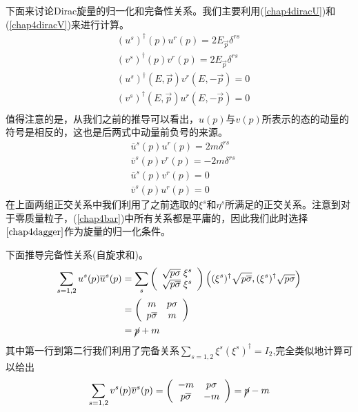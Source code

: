 下面来讨论Dirac旋量的归一化和完备性关系。我们主要利用(\ref{chap4diracU})和(\ref{chap4diracV})来进行计算。
\begin{equation}
\label{chap4dagger}
    \begin{aligned}
        &(u^{s})^{\dagger}(p)u^{r}(p)=2E_{\vec{p}}\delta^{rs}\\
        &(v^{s})^{\dagger}(p)v^{r}(p)=2E_{\vec{p}}\delta^{rs}\\
        &(u^{s})^{\dagger}(E,\vec{p})v^{r}(E,-\vec{p})=0\\
        &(v^{s})^{\dagger}(E,\vec{p})u^{r}(E,-\vec{p})=0\\
            \end{aligned}
\end{equation}
值得注意的是，从我们之前的推导可以看出，$u(p)$与$v(p)$所表示的态的动量的符号是相反的，这也是后两式中动量前负号的来源。
\begin{equation}
    \begin{aligned}
    \label{chap4bar}
       &\overline{u}^{s}(p)u^{r}(p)=2m\delta^{rs}\\
        &\overline{v}^{s}(p)v^{r}(p)=-2m\delta^{rs}\\
        &\overline{u}^{s}(p)v^{r}(p)=0\\
        &\overline{v}^{s}(p)u^{r}(p)=0
    \end{aligned}
\end{equation}
在上面两组正交关系中我们利用了之前选取的$\xi^{s}$和$\eta^{s}$所满足的正交关系。注意到对于零质量粒子，(\ref{chap4bar})中所有关系都是平庸的，因此我们此时选择$\ref{chap4dagger}$作为旋量的归一化条件。

下面推导完备性关系(自旋求和)。
\begin{equation}
\label{chap4complete1}
\begin{aligned}
    \sum\limits_{s=1,2}u^{s}(p)\overline{u}^{s}(p)&=\sum\limits_{s}\left(\begin{array}{cc}
         \sqrt{p\sigma}\;\xi^{s}  \\
         \sqrt{p\overline{\sigma}}\;\xi^{s} 
    \end{array}\right)\left((\xi^{s})^{\dagger}\sqrt{p\overline{\sigma}},(\xi^{s})^{\dagger}\sqrt{p{\sigma}}\right)\\
    &=\left(\begin{array}{cc}
        m & p\sigma \\
        p\overline{\sigma} & m
    \end{array}\right)\\
    &=\cancel{p}+m
    \end{aligned}
\end{equation}
其中第一行到第二行我们利用了完备关系$\sum\limits_{s=1,2}\xi^{s}(\xi^{s})^{\dagger}=I_{2}$,完全类似地计算可以给出
\begin{equation}
\label{chap4complete2}
    \sum\limits_{s=1,2}v^{s}(p)\overline{v}^{s}(p)=\left(\begin{array}{cc}
        -m & p\sigma \\
        p\overline{\sigma} & -m
    \end{array}\right)=\cancel{p}-m
\end{equation}
